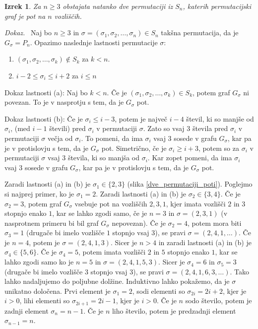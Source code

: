 \documentclass[a4paper, 12pt]{book}
\newtheorem{izrek}{Izrek}[chapter]
\newenvironment{dokaz}{\emph{Dokaz.}\ }{\hspace{\fill}{$\Box$}}
\begin{document}
\begin{izrek}
\label{izrek_dve_permutaciji_poti}
    Za $n \geq 3$ obstajata natanko dve permutaciji iz $S_n$, katerih permutacijski graf je pot na $n$ vozliščih.
\end{izrek}
\begin{dokaz}
    Naj bo $n \geq 3$ in $\sigma = (\sigma_1, \sigma_2,\dots, \sigma_n) \in S_n$ takšna permutacija, da je $G_{\sigma} = P_n$. Opazimo naslednje lastnosti permutacije $\sigma$:
    \begin{enumerate}[label=(\alph*)]
        \item $(\sigma_1, \sigma_2, \dots, \sigma_k) \notin S_k$ za $k < n$.
        \item $i-2 \leq \sigma_i \leq i+2$ za $i \leq n$
    \end{enumerate}
    
    Dokaz lastnosti (a): Naj bo $k < n$. Če je $(\sigma_1, \sigma_2, \dots, \sigma_k) \in S_k$, potem graf $G_{\sigma}$ ni povezan. To je v nasprotju s tem, da je $G_{\sigma}$ pot.
    
    Dokaz lastnosti (b): Če je $\sigma_i \leq i-3$, potem je največ $i-4$ števil, ki so manjše od $\sigma_i$, (med $i-1$ števili) pred $\sigma_i$ v permutaciji $\sigma$. Zato so vsaj 3 števila pred $\sigma_i$ v permutaciji $\sigma$ večja od $\sigma_i$. To pomeni, da ima $\sigma_i$ vsaj $3$ sosede v grafu $G_{\sigma}$, kar pa je v protislovju s tem, da je $G_{\sigma}$ pot. Simetrično, če je $\sigma_i \geq i+3$, potem so za $\sigma_i$ v permutaciji $\sigma$ vsaj 3 števila, ki so manjša od $\sigma_i$. Kar zopet pomeni, da ima $\sigma_i$ vsaj $3$ sosede v grafu $G_{\sigma}$, kar pa je v protislovju s tem, da je $G_{\sigma}$ pot.

    Zaradi lastnosti (a) in (b) je $\sigma_1 \in \{ 2, 3\}$ (slika \ref{dve_permutaciji_poti}). Poglejmo si najprej primer, ko je $\sigma_1 = 2$. Zaradi lastnosti (a) in (b) je $\sigma_2 \in \{ 3, 4 \}$. Če je $\sigma_2 = 3$, potem graf $G_{\sigma}$ vsebuje pot na vozliščih $2, 3, 1$, kjer imata vozlišči $2$ in $3$ stopnjo enako $1$, kar se lahko zgodi samo, če je $n = 3$ in $\sigma = (2, 3, 1)$ (v nasprotnem primeru bi bil graf $G_{\sigma}$ nepovezan). Če je $\sigma_2 = 4$, potem mora biti $\sigma_3 = 1$ (drugače bi imelo vozlišče $1$ stopnjo vsaj $3$), se pravi $\sigma = (2, 4, 1, \dots)$. Če je $n = 4$, potem je $\sigma = (2, 4, 1, 3)$. Sicer je $n > 4$ in zaradi lastnosti (a) in (b) je $\sigma_4 \in \{ 5, 6 \}$. Če je $\sigma_4 = 5$, potem imata vozlišči $2$ in $5$ stopnjo enako $1$, kar se lahko zgodi samo ko je $n = 5$ in $\sigma = (2, 4, 1, 5, 3)$. Sicer je $\sigma_4 = 6$ in $\sigma_5 = 3$ (drugače bi imelo vozlišče $3$ stopnjo vsaj $3$), se pravi $\sigma = (2, 4, 1, 6, 3,\dots)$. Tako lahko nadaljujemo do poljubne dolžine. Induktivno lahko pokažemo, da je $\sigma$ unikatno določena. Prvi element je $\sigma_1 = 2$, sodi elementi so $\sigma_{2i} = 2i + 2$, kjer je $i > 0$, lihi elementi so $\sigma_{2i + 1} = 2i - 1$, kjer je $i > 0$. Če je $n$ sodo število, potem je zadnji element $\sigma_n = n-1$. Če je $n$ liho število, potem je predzadnji element $\sigma_{n-1} = n$. 
    

\end{dokaz}
\end{document}
